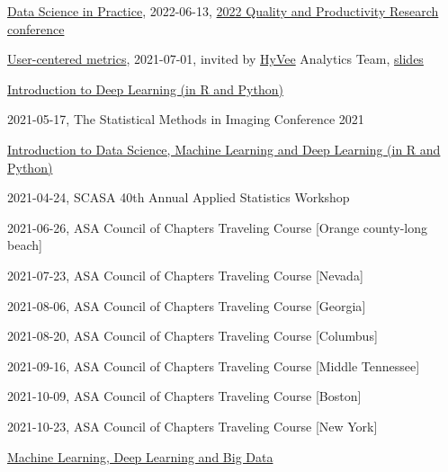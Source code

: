 \documentclass[11pt,]{article}
\providecommand{\tightlist}{%
  \setlength{\itemsep}{0pt}\setlength{\parskip}{0pt}}
\renewenvironment{itemize}{
  \begin{list}{}{
    \setlength{\leftmargin}{1.5em}
  }
}{
  \end{list}
}
\begin{document}
\begin{itemize}
\item
  \href{https://course2022.scientistcafe.com/course-syllabus/}{Data
  Science in Practice}, 2022-06-13,
  \href{https://qprc2022.com/short-course}{2022 Quality and Productivity
  Research conference}
\item
  \href{https://scientistcafe.com/2021/07/14/usercenteredmetrics.html}{User-centered
  metrics}, 2021-07-01, invited by
  \href{https://en.wikipedia.org/wiki/Hy-Vee}{HyVee} Analytics Team,
  \href{https://scientistcafe.com/talks/2021_06usermetric/usermetric\#/}{slides}
\item
  \href{https://smi2021.scientistcafe.com/}{Introduction to Deep
  Learning (in R and Python)}

  \begin{itemize}
  \tightlist
  \item
    2021-05-17, The Statistical Methods in Imaging Conference 2021
  \end{itemize}
\item
  \href{https://course2021.scientistcafe.com/}{Introduction to Data
  Science, Machine Learning and Deep Learning (in R and Python)}

  \begin{itemize}
  \tightlist
  \item
    2021-04-24, SCASA 40th Annual Applied Statistics Workshop
  \item
    2021-06-26, ASA Council of Chapters Traveling Course {[}Orange
    county-long beach{]}
  \item
    2021-07-23, ASA Council of Chapters Traveling Course {[}Nevada{]}
  \item
    2021-08-06, ASA Council of Chapters Traveling Course {[}Georgia{]}
  \item
    2021-08-20, ASA Council of Chapters Traveling Course {[}Columbus{]}
  \item
    2021-09-16, ASA Council of Chapters Traveling Course {[}Middle
    Tennessee{]}
  \item
    2021-10-09, ASA Council of Chapters Traveling Course {[}Boston{]}
  \item
    2021-10-23, ASA Council of Chapters Traveling Course {[}New York{]}
  \end{itemize}
\item
  \href{https://course2020.scientistcafe.com/course-syllabus/}{Machine
  Learning, Deep Learning and Big Data}


\end{itemize}
\end{document}
